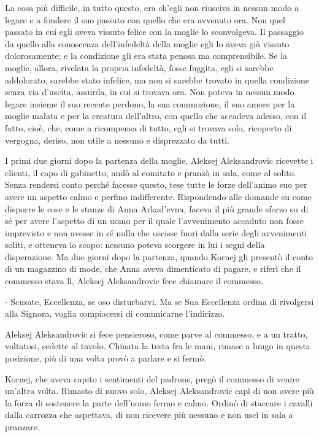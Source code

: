 La cosa più difficile, in tutto questo, era ch'egli non riusciva in nessun modo a legare e a fondere il suo passato con quello che era avvenuto ora. Non quel passato in cui egli aveva vissuto felice con la moglie lo sconvolgeva. Il passaggio da quello alla conoscenza dell'infedeltà della moglie egli lo aveva già vissuto dolorosamente; e la condizione gli era stata penosa ma comprensibile. Se la moglie, allora, rivelata la propria infedeltà, fosse fuggita, egli si sarebbe addolorato, sarebbe stato infelice, ma non si sarebbe trovato in quella condizione senza via d'uscita, assurda, in cui si trovava ora. Non poteva in nessun modo legare insieme il suo recente perdono, la sua commozione, il suo amore per la moglie malata e per la creatura dell'altro, con quello che accadeva adesso, con il fatto, cioè, che, come a ricompensa di tutto, egli si trovava solo, ricoperto di vergogna, deriso, non utile a nessuno e disprezzato da tutti. 

I primi due giorni dopo la partenza della moglie, Aleksej Aleksandrovic ricevette i clienti, il capo di gabinetto, andò al comitato e pranzò in sala, come al solito. Senza rendersi conto perché facesse questo, tese tutte le forze dell'animo suo per avere un aspetto calmo e perfino indifferente. Rispondendo alle domande su come disporre le cose e le stanze di Anna Arkad'evna, faceva il più grande sforzo su di sé per avere l'aspetto di un uomo per il quale l'avvenimento accaduto non fosse imprevisto e non avesse in sé nulla che uscisse fuori dalla serie degli avvenimenti soliti, e otteneva lo scopo: nessuno poteva scorgere in lui i segni della disperazione. Ma due giorni dopo la partenza, quando Kornej gli presentò il conto di un magazzino di mode, che Anna aveva dimenticato di pagare, e riferì che il commesso stava lì, Aleksej Aleksandrovic fece chiamare il commesso. 

- Scusate, Eccellenza, se oso disturbarvi. Ma se Sua Eccellenza ordina di rivolgersi alla Signora, voglia compiacersi di comunicarne l'indirizzo. 

Aleksej Aleksandrovic si fece pensieroso, come parve al commesso, e a un tratto, voltatosi, sedette al tavolo. Chinata la testa fra le mani, rimase a lungo in questa posizione, più di una volta provò a parlare e si fermò. 

Kornej, che aveva capito i sentimenti del padrone, pregò il commesso di venire un'altra volta. Rimasto di nuovo solo, Aleksej Aleksandrovic capì di non avere più la forza di sostenere la parte dell'uomo fermo e calmo. Ordinò di staccare i cavalli dalla carrozza che aspettava, di non ricevere più nessuno e non uscì in sala a pranzare. 


